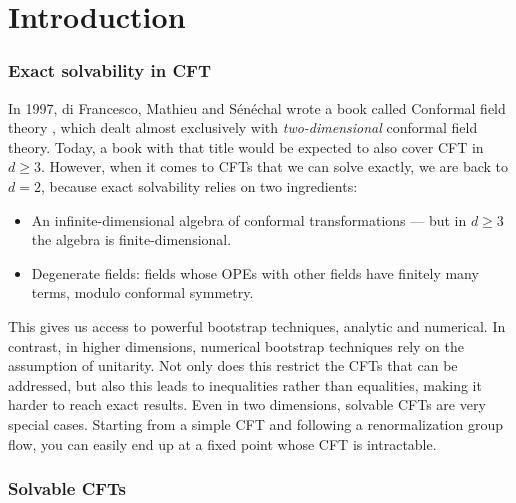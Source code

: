 \documentclass[12pt, a4paper]{article}
\theoremstyle{break}
\begin{document}
\clearpage

\tableofcontents

\hypersetup{linkcolor=blue}

\setcounter{section}{-1}

\pagebreak

\section{Introduction}

\subsubsection*{Exact solvability in CFT}

In 1997, di Francesco, Mathieu and Sénéchal wrote a book called Conformal field theory \cite{fms97}, which dealt almost exclusively with \textit{two-dimensional} conformal field theory. Today, a book with that title would be expected to also cover CFT in $d\geq 3$. However, when it comes to CFTs that we can solve exactly, we are back to $d=2$, because exact solvability relies on two ingredients:
\begin{itemize}
 \item An infinite-dimensional algebra of conformal transformations --- but in $d\geq 3$ the algebra is finite-dimensional. 
 \item Degenerate fields: fields whose OPEs with other fields have finitely many terms, modulo conformal symmetry. 
\end{itemize}
This gives us access to powerful bootstrap techniques, analytic and numerical. In contrast, in higher dimensions, numerical bootstrap techniques rely on the assumption of unitarity. Not only does this restrict the CFTs that can be addressed, but also this leads to inequalities rather than equalities, making it harder to reach exact results. 
Even in two dimensions, solvable CFTs are very special cases. Starting from a simple CFT and following a renormalization group flow, you can easily end up at a fixed point whose CFT is intractable. 

\subsubsection*{Solvable CFTs}
\end{document}
